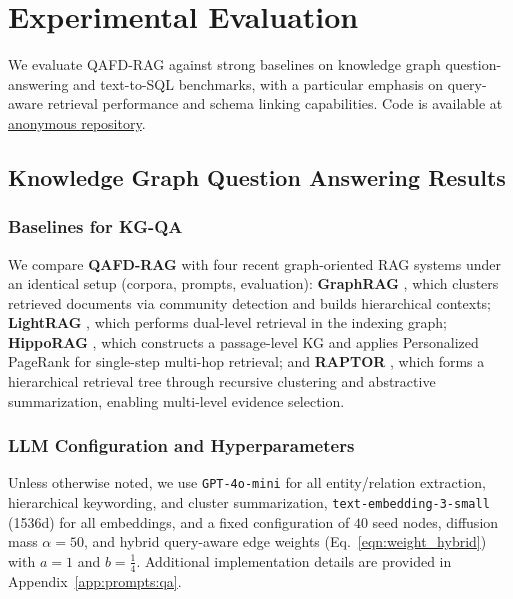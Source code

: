 \documentclass{article} %
\begin{document}
\section{Experimental Evaluation}
\label{sec:experiments}

We evaluate QAFD-RAG against strong baselines on knowledge graph question-answering and text-to-SQL benchmarks, with a particular emphasis on query-aware retrieval performance and schema linking capabilities. Code is available at \href{https://anonymous.4open.science/r/QAFD-E5B6/}{anonymous repository}.




\subsection{Knowledge Graph Question Answering Results}

\subsubsection{Baselines for KG-QA}
We compare \textbf{QAFD-RAG} with four recent graph-oriented RAG systems under an identical setup (corpora, prompts, evaluation): 
\textbf{GraphRAG} \citep{edge2024local}, which clusters retrieved documents via community detection and builds hierarchical contexts; 
\textbf{LightRAG} \citep{guo2024lightrag}, which performs dual-level retrieval in the indexing graph; 
\textbf{HippoRAG} \citep{jimenez2024hipporag}, which constructs a passage-level KG and applies Personalized PageRank for single-step multi-hop retrieval; and 
\textbf{RAPTOR} \citep{sarthi2024raptor}, which forms a hierarchical retrieval tree through recursive clustering and abstractive summarization, enabling multi-level evidence selection.

\subsubsection{LLM Configuration and Hyperparameters}
Unless otherwise noted, we use \texttt{GPT-4o-mini} for all entity/relation extraction, hierarchical keywording, and cluster summarization, \texttt{text-embedding-3-small} (1536d) for all embeddings, and a fixed configuration of \(40\) seed nodes, diffusion mass \(\alpha = 50\), and hybrid query-aware edge weights (Eq.~\eqref{eqn:weight_hybrid}) with \(a = 1\) and \(b = \tfrac14\). Additional implementation details are provided in Appendix~\ref{app:prompts:qa}.
\end{document}
